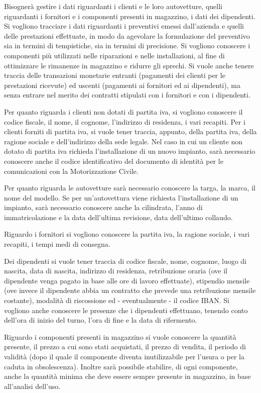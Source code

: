 		Bisognerà gestire i dati riguardanti i clienti e le loro autovetture, quelli riguardanti i fornitori e i componenti presenti in magazzino, i dati dei dipendenti. Si vogliono tracciare i dati riguardanti i preventivi emessi dall’azienda e quelli delle prestazioni effettuate, in modo da agevolare la formulazione del preventivo sia in termini di tempistiche, sia in termini di precisione. Si vogliono conoscere i componenti più utilizzati nelle riparazioni e nelle installazioni, al fine di ottimizzare le rimanenze in magazzino e ridurre gli sprechi. Si vuole anche tenere traccia delle transazioni monetarie entranti (pagamenti dei clienti per le prestazioni ricevute) ed uscenti (pagamenti ai fornitori ed ai dipendenti), ma senza entrare nel merito dei contratti stipulati con i fornitori e con i dipendenti.
		
		Per quanto riguarda i clienti non dotati di partita iva, si vogliono conoscere il codice fiscale, il nome, il cognome, l’indirizzo di residenza, i vari recapiti. Per i clienti forniti di partita iva, si vuole tener traccia, appunto, della partita iva, della ragione sociale e dell’indirizzo della sede legale. Nel caso in cui un cliente non dotato di partita iva richieda l’installazione di un nuovo impianto, sarà necessario conoscere anche il codice identificativo del documento di identità per le comunicazioni con la Motorizzazione Civile. 
		
		Per quanto riguarda le autovetture sarà necessario conoscere la targa, la marca, il nome del modello. Se per un’autovettura viene richiesta l’installazione di un impianto, sarà necessario conoscere anche la cilindrata, l’anno di immatricolazione e la data dell’ultima revisione, data dell’ultimo collaudo. 
		
		Riguardo i fornitori si vogliono conoscere la partita iva, la ragione sociale, i vari recapiti, i tempi medi di consegna. 
		
		Dei dipendenti si vuole tener traccia di codice fiscale, nome, cognome, luogo di nascita, data di nascita, indirizzo di residenza, retribuzione oraria (ove il dipendente venga pagato in base alle ore di lavoro effettuate), stipendio mensile (ove invece il dipendente abbia un contratto che prevede una retribuzione mensile costante), modalità di riscossione ed - eventualmente - il codice IBAN. Si vogliono anche conoscere le presenze che i dipendenti effettuano, tenendo conto dell’ora di inizio del turno, l’ora di fine e la data di rifermento.
		
		Riguardo i componenti presenti in magazzino si vuole conoscere la quantità presente, il prezzo a cui sono stati acquistati, il prezzo di vendita, il periodo di validità (dopo il quale il componente diventa inutilizzabile per l’usura o per la caduta in obsolescenza). Inoltre sarà possibile stabilire, di ogni componente, anche la quantità minima che deve essere sempre presente in magazzino, in base all’analisi dell’uso. 
		
